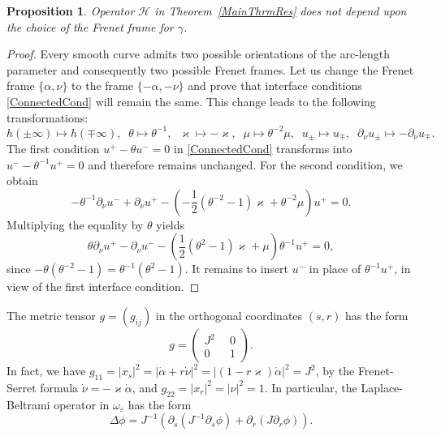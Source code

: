 \documentclass[reqno]{amsart}
\theoremstyle{plain}
\newtheorem{prop}{Proposition}
\numberwithin{equation}{section}
\renewcommand{\kappa}{\varkappa}
\newcommand{\eps}{\varepsilon}
\begin{document}
\begin{prop}\label{PropInvarianceOfCnds}
  Operator $\mathcal{H}$ in Theorem~\ref{MainThrmRes} does not depend upon the choice of the Frenet frame for  $\gamma$.
\end{prop}
\begin{proof}
Every smooth curve  admits two possible orientations of the arc-length parameter and consequently two possible  Frenet frames. Let us change the Frenet frame $\{\alpha, \nu\}$ to the frame $\{-\alpha, -\nu\}$ and prove that interface conditions \eqref{ConnectedCond} will remain the same. This change leads to the following transformations:
\begin{equation*}
h(\pm\infty)\mapsto h(\mp\infty),\;\;
\theta\mapsto \theta^{-1}, \;\; \kappa\mapsto -\kappa,\;\; \mu\mapsto \theta^{-2}\mu, \;\; u_\pm\mapsto u_\mp, \;\; \partial_\nu u_\pm \mapsto -\partial_\nu u_\mp.
\end{equation*}
The first condition $u^+-\theta u^-=0$ in \eqref{ConnectedCond} transforms into $u^--\theta^{-1} u^+=0$ and therefore remains unchanged. For the second condition, we obtain
\begin{equation*}
 	-\theta^{-1}\partial_\nu u^-+\partial_\nu u^+
	-\left(-\textstyle\frac{1}{2}(\theta^{-2}-1)\kappa
	+\theta^{-2}\mu\right) u^+=0.
\end{equation*}
Multiplying the equality by $\theta$  yields
\begin{equation*}
	\theta\partial_\nu u^+-\partial_\nu u^-
	-\left(\textstyle\frac{1}{2 }(\theta^{2}-1)\kappa+\mu\right) 	\theta^{-1} u^+=0,
\end{equation*}
since $-\theta(\theta^{-2}-1)=\theta^{-1}(\theta^{2}-1)$. It remains to insert $u^-$ in place of $\theta^{-1} u^+$, in view of the first interface condition.
\end{proof}





The metric tensor $g=(g_{ij})$ in the orthogonal coordinates $(s,r)$  has the form
  \begin{equation*}
    g=
    \begin{pmatrix}
      J^2\phantom{0} & 0 \\
          0\phantom{0} & 1
    \end{pmatrix}.
  \end{equation*}
In fact, we have
$g_{11}=|x_s|^2=|\dot{\alpha}+r \dot{\nu}|^2
=|(1-r\kappa) \dot{\alpha}|^2=J^2$,
by the Frenet-Serret formula $\dot{\nu}=-\kappa \dot{\alpha}$, and $g_{22}=|x_r|^2=|\nu|^2=1$.
In particular,  the  Laplace-Beltrami operator in $\omega_\eps$ has  the form
\begin{equation}\label{LaplacianInSN}
\Delta \phi=J^{-1}\left(\partial_s(J^{-1}\partial_s \phi)+ \partial_r(J\partial_r \phi)\right).
\end{equation}
\end{document}
